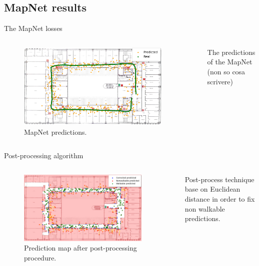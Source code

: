 \documentclass[
    center,
]{beamer}
\begin{document}
\subsection{MapNet results}
\begin{frame}{The MapNet losses}
    \begin{columns}
    \begin{figure}
        \centering
        \includegraphics[width=0.9\textwidth]{../imgs/mapnet_map.png}
        \caption{MapNet predictions.}
    \end{figure}

    The predictions of the MapNet (non so cosa scrivere)
    \end{columns}
\end{frame}
\begin{frame}{Post-processing algorithm}
    \begin{columns}
        \begin{figure}
            \centering
            \includegraphics[width=0.9\textwidth]{../imgs/walkable_postprocess.png}
            \caption{Prediction map after post-processing procedure.}
        \end{figure}

        Post-process technique base on Euclidean distance in order to fix non walkable predictions.
    \end{columns}
\end{frame}
\end{document}
